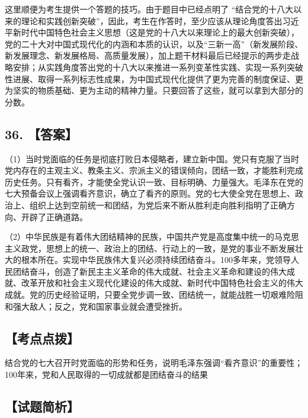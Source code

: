 \documentclass[UTF8,11pt]{ctexart}
\begin{document}
这里顺便为考生提供一个答题的技巧。由于题目中已经点明了 “结合党的十八大以来的理论和实践创新突破”，因此，考生在作答时，至少应该从理论角度答出习近平新时代中国特色社会主义思想（这是党的十八大以来理论上的最大创新突破），党的二十大对中国式现代化的内涵和本质的认识，以及“三新一高”（新发展阶段、新发展理念、新发展格局、高质量发展），加上题干材料最后已经提示的两步走战略安排；从实践角度答出党的十八大以来推进一系列变革性实践、实现一系列突破性进展、取得一系列标志性成果，为中国式现代化提供了更为完善的制度保证、更为坚实的物质基础、更为主动的精神力量。只要回答了这些，就可以拿到大部分的分数。


\subsection*{36. 【答案】}

（1）当时党面临的任务是彻底打败日本侵略者，建立新中国。党只有克服了当时党内存在的主观主义、教条主义、宗派主义的错误倾向，团结一致，才能胜利完成历史任务。只有看齐，才能使全党认识一致、目标明确、力量强大。毛泽东在党的七大预备会议上强调看齐意识，确立了看齐的原则。党的七大使全党在思想上、政治上、组织上达到空前统一和团结，为党后来不断从胜利走向胜利指明了正确方向、开辟了正确道路。


（2）中华民族是有着伟大团结精神的民族，中国共产党是高度集中统一的马克思主义政党，思想上的统一、政治上的团结、行动上的一致，是党的事业不断发展壮大的根本所在。实现中华民族伟大复兴必须持续团结奋斗。100多年来，党领导人民团结奋斗，创造了新民主主义革命的伟大成就、社会主义革命和建设的伟大成就、改革开放和社会主义现代化建设的伟大成就、新时代中国特色社会主义的伟大成就。党的历史经验证明，只要全党步调一致、团结统一，就能战胜一切艰难险阻和强大敌人；反之，党和国家事业就会遭受挫折。


\subsection*{【考点点拨】}

结合党的七大召开时党面临的形势和任务，说明毛泽东强调“看齐意识”的重要性；100年来，党和人民取得的一切成就都是团结奋斗的结果


\subsection*{【试题简析】}
\end{document}
